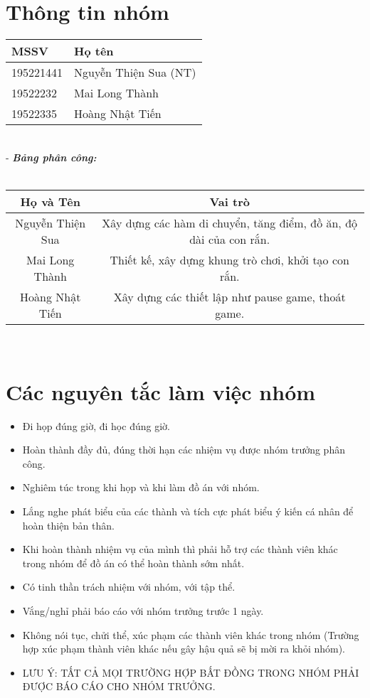 \documentclass[12pt]{article}
\begin{document}
\section{Thông tin nhóm}
\begin{tabular}{|l|l|}
\hline
MSSV  & Họ tên  \\  \hline
195221441  & Nguyễn Thiện Sua (NT)  \\  \hline
19522232  & Mai Long Thành  \\  \hline
19522335  & Hoàng Nhật Tiến  \\  \hline
\end{tabular}
\\
 - \emph{\bfseries Bảng phân công:}\\
\\
\begin{tabular}{ |c|c| } 
\hline
Họ và Tên & Vai trò \\ \hline
Nguyễn Thiện Sua & Xây dựng các hàm di chuyển, tăng điểm, đồ ăn, độ dài của con rắn. \\ \hline
Mai Long Thành & Thiết kế, xây dựng khung trò chơi, khởi tạo con rắn. \\
\hline
Hoàng Nhật Tiến & Xây dựng các thiết lập như pause game, thoát game. \\
\hline
\end{tabular}
\\
\section{Các nguyên tắc làm việc nhóm}
 \begin{itemize}
     \item Đi họp đúng giờ, đi học đúng giờ.
     \item Hoàn thành đầy đủ, đúng thời hạn các nhiệm vụ được nhóm trưởng phân công.
     \item Nghiêm túc trong khi họp và khi làm đồ án với nhóm.
     \item Lắng nghe phát biểu của các thành và tích cực phát biểu ý kiến cá nhân để hoàn thiện bản thân.
     \item Khi hoàn thành nhiệm vụ của mình thì phải hỗ trợ các thành viên khác trong nhóm để đồ án có thể hoàn thành sớm nhất.
     \item Có tinh thần trách nhiệm với nhóm, với tập thể.
     \item Vắng/nghỉ phải báo cáo với nhóm trưởng trước 1 ngày.
     \item Không nói tục, chửi thể, xúc phạm các thành viên khác trong nhóm (Trường hợp xúc phạm thành viên khác nếu gây hậu quả sẽ bị mời ra khỏi nhóm).
     \item LƯU Ý: TẤT CẢ MỌI TRƯỜNG HỢP BẤT ĐỒNG TRONG NHÓM PHẢI ĐƯỢC BÁO CÁO CHO NHÓM TRƯỞNG.
\end{itemize}
\end{document}
